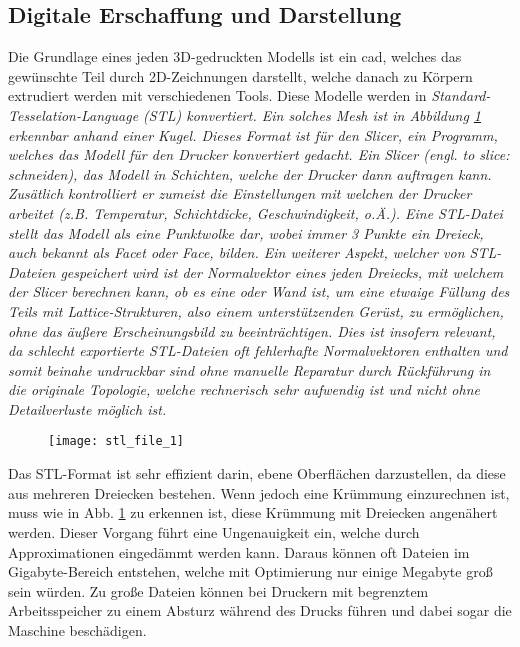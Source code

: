 \documentclass[../main.tex]{subfiles}
\begin{document}
\subsection{Digitale Erschaffung und Darstellung}
Die Grundlage eines jeden 3D-gedruckten Modells ist ein \acrfull{cad}, welches das gewünschte Teil durch 2D-Zeichnungen darstellt, welche danach zu Körpern extrudiert werden mit verschiedenen Tools. Diese Modelle werden  in \it{Standard-Tesselation-Language} (STL) konvertiert. Ein solches \it{Mesh} ist in Abbildung \ref{img:stl_1} erkennbar anhand einer Kugel. Dieses Format ist für den \it{Slicer}, ein Programm, welches das Modell für den Drucker konvertiert gedacht. Ein Slicer (engl. \it{to slice}: schneiden),  das Modell in Schichten, welche der Drucker dann auftragen kann. Zusätlich kontrolliert er zumeist die Einstellungen mit welchen der Drucker arbeitet (z.B. Temperatur, Schichtdicke, Geschwindigkeit, o.Ä.). Eine STL-Datei stellt das Modell als eine Punktwolke dar, wobei immer 3 Punkte ein Dreieck, auch bekannt als \it{Facet} oder \it{Face}, bilden. Ein weiterer Aspekt, welcher von STL-Dateien gespeichert wird ist der Normalvektor eines jeden Dreiecks, mit welchem der Slicer berechnen kann, ob es eine  oder  Wand ist, um eine etwaige Füllung des Teils mit \it{Lattice}-Strukturen, also einem unterstützenden Gerüst, zu ermöglichen, ohne das äußere Erscheinungsbild zu beeinträchtigen. Dies ist insofern relevant, da schlecht exportierte STL-Dateien oft fehlerhafte Normalvektoren enthalten und somit beinahe undruckbar sind ohne manuelle Reparatur durch Rückführung in die originale Topologie, welche rechnerisch sehr aufwendig ist und nicht ohne Detailverluste möglich ist.
\begin{figure}[h]
\begin{center}
	\texttt{[image: stl\_file\_1]}
	\label{img:stl_1}
\end{center}
\end{figure}	
Das STL-Format ist sehr effizient darin, ebene Oberflächen darzustellen, da diese aus mehreren Dreiecken bestehen. Wenn jedoch eine Krümmung einzurechnen ist, muss wie in Abb. \ref{img:stl_1} zu erkennen ist, diese Krümmung mit Dreiecken angenähert werden. Dieser Vorgang führt eine Ungenauigkeit ein, welche durch Approximationen eingedämmt werden kann. Daraus können oft Dateien im Gigabyte-Bereich entstehen, welche mit Optimierung nur einige Megabyte groß sein würden. Zu große Dateien können bei Druckern mit begrenztem Arbeitsspeicher zu einem Absturz während des Drucks führen und dabei sogar die Maschine beschädigen. \parencite{stl_1} 
\end{document}
